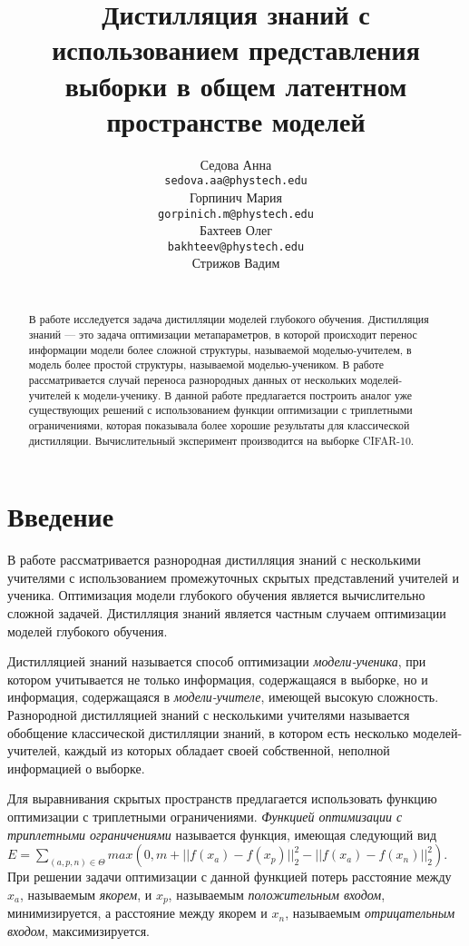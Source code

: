 \documentclass{article}
\title{Дистилляция знаний с использованием представления выборки в общем латентном пространстве моделей}
\author{Седова Анна \\
	\texttt{sedova.aa@phystech.edu} \\
    \And
	Горпинич Мария\\
	\texttt{gorpinich.m@phystech.edu} \\
	\And
	Бахтеев Олег \\
	\texttt{bakhteev@phystech.edu} \\
	\And
	Стрижов Вадим \\
	\texttt{} \\
}
\begin{document}
\maketitle

\begin{abstract}
В работе исследуется задача дистилляции моделей глубокого обучения. Дистилляция знаний — это задача оптимизации метапараметров, в которой происходит перенос информации модели более сложной структуры, называемой моделью-учителем, в модель более простой структуры, называемой моделью-учеником. В работе рассматривается случай переноса разнородных данных от нескольких моделей-учителей к модели-ученику. В данной работе предлагается построить аналог уже существующих решений с использованием функции оптимизации с триплетными ограничениями, которая показывала более хорошие результаты для классической дистилляции. Вычислительный эксперимент производится на выборке CIFAR-10.
\end{abstract}



\section{Введение}

В работе рассматривается разнородная дистилляция знаний с  несколькими учителями с использованием промежуточных скрытых представлений учителей и ученика. Оптимизация модели глубокого обучения является вычислительно сложной задачей. Дистилляция знаний является частным случаем оптимизации моделей глубокого обучения.

Дистилляцией знаний называется способ оптимизации \textit{модели-ученика}, при котором учитывается не только информация, содержащаяся в выборке, но и информация, содержащаяся в \textit{модели-учителе}, имеющей высокую сложность. Разнородной дистилляцией знаний с несколькими учителями называется обобщение классической дистилляции знаний, в котором есть несколько моделей-учителей, каждый из которых обладает своей собственной, неполной информацией о выборке.

Для выравнивания скрытых пространств предлагается использовать функцию оптимизации с триплетными ограничениями. \textit{Функцией оптимизации с триплетными ограничениями} называется функция, имеющая следующий вид $E =
\sum_{(a,p,n)∈Θ}
max(0, m + ||f(x_a)  −  f(x_p)||_2^2 
- ||f(x_a)  −  f(x_n)||_2^2
)$.
При решении задачи оптимизации с данной функцией потерь расстояние между $x_a$, называемым \textit{якорем}, и $x_p$, называемым \textit{положительным входом}, минимизируется, а расстояние между якорем и $x_n$, называемым \textit{отрицательным входом}, максимизируется.
\end{document}
